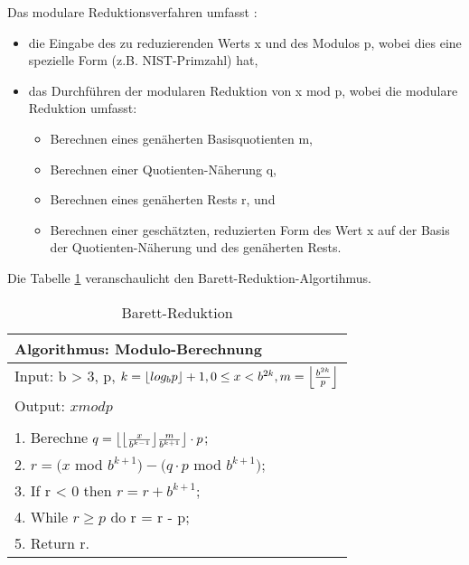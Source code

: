 Das modulare Reduktionsverfahren umfasst \cite{patent}:
\begin{itemize}
       \item die Eingabe des zu reduzierenden Werts x und des Modulos p, wobei dies eine spezielle Form (z.B. NIST-Primzahl) hat,
       \item das Durchführen der modularen Reduktion von x mod p, wobei die modulare Reduktion umfasst:
       \begin{itemize}
         \item Berechnen eines genäherten Basisquotienten m,
         \item Berechnen einer Quotienten-Näherung q, 
         \item Berechnen eines genäherten Rests r, und
         \item Berechnen einer geschätzten, reduzierten Form des Wert x auf der Basis der Quotienten-Näherung und des genäherten Rests.
       \end{itemize}
\end{itemize}

 Die Tabelle \ref{tab3} veranschaulicht den Barett-Reduktion-Algortihmus. 



\begin{table}[!ht]
\centering
	\begin{tabular}{l}
		\toprule
		\textbf{Algorithmus: Modulo-Berechnung}\\
		\midrule
		Input: b > 3, p, $ k = \floor*{log_bp} + 1, 0 \leq x < b^{2k}, m = \floor*{\frac{b^{2k}}{p}} $\\
		Output: $ x  mod  p $ \\
		                                           \\
		                                           
		1. Berechne $ q = \floor*{ \floor*{\frac{x}{b^{k-1}}} \frac{m}{b^{k+1}} }\cdot p $;\\
		2. $ r = (x $ mod $ b^{k+1} ) - (q \cdot p $ mod $ b^{k+1})$;  \\
		3. If r < 0 then $ r = r + b^{k+1}$;\\ 
		4. While $ r \geq p $ do r = r - p; \\
		5. Return r. \\
	   \bottomrule
	\end{tabular}
	\caption{Barett-Reduktion\cite{nist}}
	\label{tab3}
\end{table}




